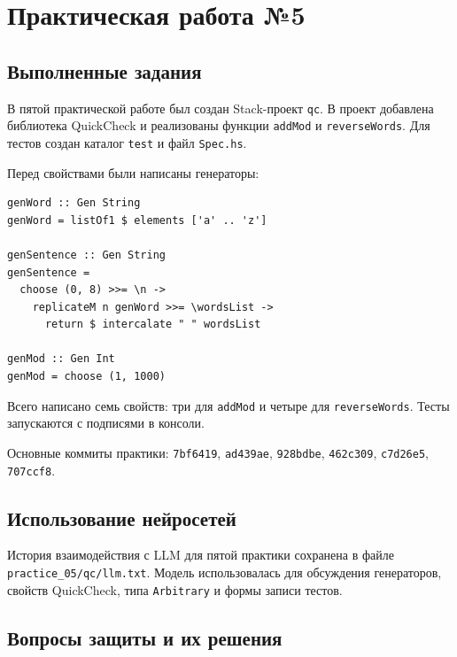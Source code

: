 \section{Практическая работа №5}
\label{sec:pr5}

\subsection{Выполненные задания}

В пятой практической работе был создан Stack-проект \texttt{qc}. В проект добавлена библиотека QuickCheck и реализованы функции \texttt{addMod} и \texttt{reverseWords}. Для тестов создан каталог \texttt{test} и файл \texttt{Spec.hs}.

Перед свойствами были написаны генераторы:

\label{lst:generators-pr5}
\begin{verbatim}
genWord :: Gen String
genWord = listOf1 $ elements ['a' .. 'z']

genSentence :: Gen String
genSentence =
  choose (0, 8) >>= \n ->
    replicateM n genWord >>= \wordsList ->
      return $ intercalate " " wordsList

genMod :: Gen Int
genMod = choose (1, 1000)
\end{verbatim}

Всего написано семь свойств: три для \texttt{addMod} и четыре для \texttt{reverseWords}. Тесты запускаются с подписями в консоли.

Основные коммиты практики: \texttt{7bf6419}, \texttt{ad439ae}, \texttt{928bdbe}, \texttt{462c309}, \texttt{c7d26e5}, \texttt{707ccf8}.

\subsection{Использование нейросетей}

История взаимодействия с LLM для пятой практики сохранена в файле \texttt{practice_05/qc/llm.txt}. Модель использовалась для обсуждения генераторов, свойств QuickCheck, типа \texttt{Arbitrary} и формы записи тестов.

\subsection{Вопросы защиты и их решения}

